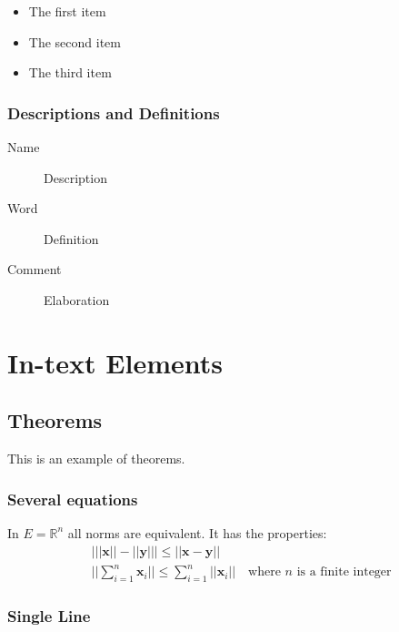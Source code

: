 \documentclass[11pt,fleqn]{book} %
\begin{document}
\begin{itemize}
\item The first item
\item The second item
\item The third item
\end{itemize}

\subsection{Descriptions and Definitions}

\begin{description}
\item[Name] Description
\item[Word] Definition
\item[Comment] Elaboration
\end{description}


\chapter{In-text Elements}

\section{Theorems}

This is an example of theorems.

\subsection{Several equations}

\begin{theorem}
In $E=\mathbb{R}^n$ all norms are equivalent. It has the properties:
\begin{align}
& \big| ||\mathbf{x}|| - ||\mathbf{y}|| \big|\leq || \mathbf{x}- \mathbf{y}||\\
&  ||\sum_{i=1}^n\mathbf{x}_i||\leq \sum_{i=1}^n||\mathbf{x}_i||\quad\text{where $n$ is a finite integer}
\end{align}
\end{theorem}

\subsection{Single Line}
\end{document}
